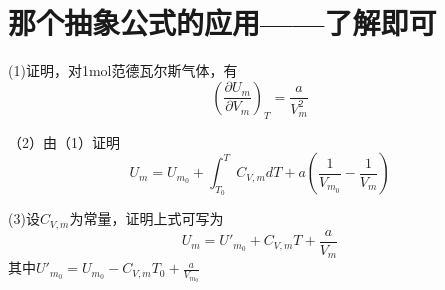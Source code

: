\documentclass[lang=cn,10pt]{elegantbook}
\begin{document}
	\section{那个抽象公式的应用——了解即可}
	\begin{example}
		(1)证明，对1mol范德瓦尔斯气体，有
		\begin{equation*}
			\left( \frac{\partial U_m}{\partial V_m} \right) _T=\frac{a}{V_{m}^{2}}
		\end{equation*}
		
		（2）由（1）证明
		\begin{equation*}
			U_m=U_{m_0}+\int_{T_0}^T{C_{V,m}dT}+a\left( \frac{1}{V_{m_0}}-\frac{1}{V_m} \right) 
		\end{equation*}
		
		(3)设$C_{V,m}$为常量，证明上式可写为
		\begin{equation*}
			U_m=U\prime_{m_0}+C_{V,m}T+\frac{a}{V_m}
		\end{equation*}
		其中$U\prime_{m_0}=U_{m_0}-C_{V,m}T_{0}+\frac{a}{V_{m_{0}}}$
	\end{example}
\end{document}
